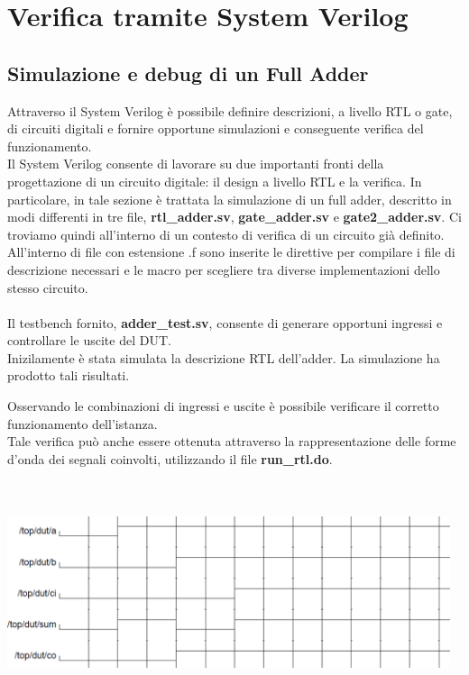\documentclass[11pt,  english, makeidx, a4paper, titlepage, oneside]{book}
\newenvironment{listato}{\footnotesize} {\normalsize }
\begin{document}
\chapter{Verifica tramite System Verilog}
\section{Simulazione e debug di un Full Adder}
Attraverso il System Verilog è possibile definire descrizioni, a livello RTL o gate, di circuiti digitali e fornire opportune simulazioni e conseguente verifica del funzionamento.\\ 
Il System Verilog consente di lavorare su due importanti fronti della progettazione di un circuito digitale: il design a livello RTL e la verifica.
In particolare, in tale sezione è trattata la simulazione di un full adder, descritto in modi differenti in tre file, \textbf{rtl\_adder.sv}, \textbf{gate\_adder.sv} e \textbf{gate2\_adder.sv}. Ci troviamo quindi all'interno di un contesto di verifica di un circuito già definito.\\
All'interno di file con estensione .f sono inserite le direttive per compilare i file di descrizione necessari e le macro per scegliere tra diverse implementazioni dello stesso circuito.\\\\
Il testbench fornito, \textbf{adder\_test.sv}, consente di generare opportuni ingressi e controllare le uscite del DUT.\\
Inizilamente è stata simulata la descrizione RTL dell'adder. La simulazione ha prodotto tali risultati.
\begin{center}
\begin{listato}
	\centerline{}
\end{listato}
\end{center}
Osservando le combinazioni di ingressi e uscite è possibile verificare il corretto funzionamento dell'istanza.\\
Tale verifica può anche essere ottenuta attraverso la rappresentazione delle forme d'onda dei segnali coinvolti, utilizzando il file \textbf{run\_rtl.do}.\\
\\\\
\centerline{\includegraphics[width=13cm]{./img/Lab_6/wave_rtl.png}}
\end{document}
